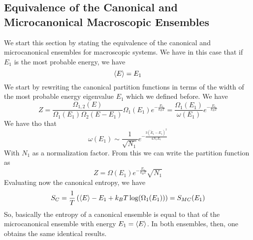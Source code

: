 \documentclass[../qm.tex]{subfiles}
\begin{document}
		\subsection{Equivalence of the Canonical and Microcanonical Macroscopic Ensembles}
		We start this section by stating the equivalence of the canonical and microcanonical ensembles for macroscopic systems. We have in this case that if $E_1$ is the most probable energy, we have
		\begin{equation}
			\expval{E}=E_1
			\label{eq:canonicalequvalence}
		\end{equation}
		We start by rewriting the canonical partition functions in terms of the width of the most probable energy eigenvalue $E_1$ which we defined before. We have
		\begin{equation}
			Z=\frac{\Omega_{1,2}(E)}{\Omega_1(E_1)\Omega_2(E-E_1)}\Omega_1(E_1)e^{-\frac{E_1}{k_BT}}=\frac{\Omega_1(E_1)}{\omega(E_1)}e^{-\frac{E_1}{k_BT}}
			\label{eq:newpartitionfunction}
		\end{equation}
		We have tho that
		\begin{equation*}
			\omega(E_1)\sim \frac{1}{\sqrt{N_1}}e^{-\frac{3(\tilde{E}_1-E_1)^2}{4N_1E_1}}
		\end{equation*}
		With $N_1$ as a normalization factor. From this we can write the partition function as
		\begin{equation}
			Z=\Omega(E_1)e^{-\frac{E_1}{k_BT}}\sqrt{N_1}
			\label{eq:partitionfunctionequivalencenew}
		\end{equation}
		Evaluating now the canonical entropy, we have
		\begin{equation}
			S_C=\frac{1}{T}\left( \expval{E}-E_1+k_BT\log(\Omega_1(E_1)) \right)=S_{MC}(E_1)
			\label{eq:entropyequivalence}
		\end{equation}
		So, basically the entropy of a canonical ensemble is equal to that of the microcanonical ensemble with energy $E_1=\expval{E}$. In both ensembles, then, one obtains the same identical results.
\end{document}
